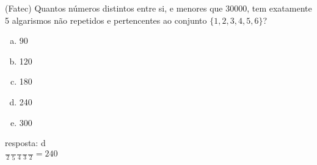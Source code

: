 \begin{ex}
	(Fatec) Quantos números distintos entre si, e menores que 30000, tem exatamente 5 algarismos não repetidos e pertencentes ao conjunto $\{1, 2, 3, 4, 5, 6\}$?
    \begin{enumerate}[(a)]
    \item 90
    \item 120
    \item 180
    \item 240
    \item 300
    \end{enumerate}
      \begin{sol}
        resposta: d \\
        $\frac{\phantom{A}}{2}\frac{\phantom{A}}{5}\frac{\phantom{A}}{4}\frac{\phantom{A}}{3}\frac{\phantom{A}}{2}=240$
      \end{sol}
\end{ex}